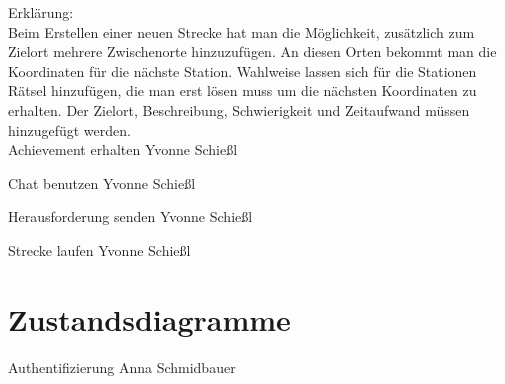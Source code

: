 \documentclass[a4paper, 12pp]{article}
\begin{document}
Erklärung:\\
Beim Erstellen einer neuen Strecke hat man die Möglichkeit, zusätzlich zum Zielort mehrere Zwischenorte hinzuzufügen. An diesen Orten bekommt man die Koordinaten für die nächste Station. Wahlweise lassen sich für die Stationen Rätsel hinzufügen, die man erst lösen muss um die nächsten Koordinaten zu erhalten. Der Zielort, Beschreibung, Schwierigkeit und Zeitaufwand müssen hinzugefügt werden.\\

{\Large Achievement erhalten}
Yvonne Schießl
\begin{figure}[H] 
\centering
	\fbox{\begin{minipage}{16cm} 
	\end{minipage}}
\end{figure}

{\Large Chat benutzen}
Yvonne Schießl
\begin{figure}[H] 
\centering
	\fbox{\begin{minipage}{16cm} 
	\end{minipage}}
\end{figure}

{\Large Herausforderung senden}
Yvonne Schießl
\begin{figure}[H] 
\centering
	\fbox{\begin{minipage}{16cm} 
	\end{minipage}}
\end{figure}

{\Large Strecke laufen}
Yvonne Schießl
\begin{figure}[H] 
\centering
	\fbox{\begin{minipage}{16cm} 
	\end{minipage}}
\end{figure}

\section{Zustandsdiagramme}

{\Large Authentifizierung}
Anna Schmidbauer
\begin{figure}[H] 
\centering
	\fbox{\begin{minipage}{16cm} 
	\end{minipage}}
\end{figure}
\end{document}
